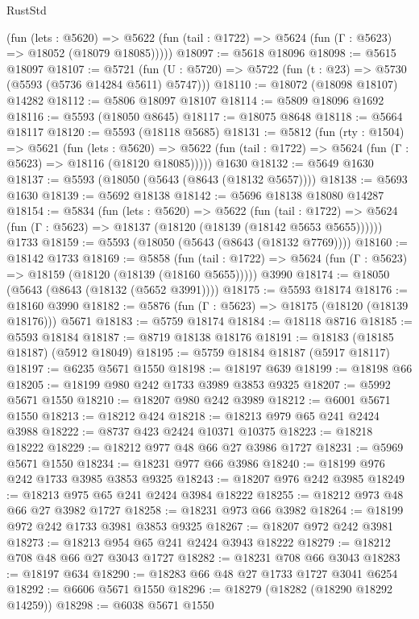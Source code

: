 \begin{lexlean}{RustStd}
\begin{coremodule}
      (fun (lets : @5620) =>
      @5622 (fun (tail : @1722) => @5624 (fun (Γ : @5623) => @18052 (@18079 @18085)))))
@18097 := @5618 @18096
@18098 := @5615 @18097
@18107 := @5721
    (fun (U : @5720) => @5722 (fun (t : @23) => @5730 (@5593 (@5736 @14284 @5611) @5747)))
@18110 := @18072 (@18098 @18107) @14282
@18112 := @5806 @18097 @18107
@18114 := @5809 @18096 @1692
@18116 := @5593 (@18050 @8645)
@18117 := @18075 @8648
@18118 := @5664 @18117
@18120 := @5593 (@18118 @5685)
@18131 := @5812
    (fun (rty : @1504) =>
    @5621
      (fun (lets : @5620) =>
      @5622 (fun (tail : @1722) => @5624 (fun (Γ : @5623) => @18116 (@18120 @18085)))))
    @1630
@18132 := @5649 @1630
@18137 := @5593 (@18050 (@5643 (@8643 (@18132 @5657))))
@18138 := @5693 @1630
@18139 := @5692 @18138
@18142 := @5696 @18138 @18080 @14287
@18154 := @5834
    (fun (lets : @5620) =>
    @5622
      (fun (tail : @1722) =>
      @5624 (fun (Γ : @5623) => @18137 (@18120 (@18139 (@18142 @5653 @5655))))))
    @1733
@18159 := @5593 (@18050 (@5643 (@8643 (@18132 @7769))))
@18160 := @18142 @1733
@18169 := @5858
    (fun (tail : @1722) => @5624 (fun (Γ : @5623) => @18159 (@18120 (@18139 (@18160 @5655)))))
    @3990
@18174 := @18050 (@5643 (@8643 (@18132 (@5652 @3991))))
@18175 := @5593 @18174
@18176 := @18160 @3990
@18182 := @5876 (fun (Γ : @5623) => @18175 (@18120 (@18139 @18176))) @5671
@18183 := @5759 @18174
@18184 := @18118 @8716
@18185 := @5593 @18184
@18187 := @8719 @18138 @18176
@18191 := @18183 (@18185 @18187) (@5912 @18049)
@18195 := @5759 @18184 @18187 (@5917 @18117)
@18197 := @6235 @5671 @1550
@18198 := @18197 @639
@18199 := @18198 @66
@18205 := @18199 @980 @242 @1733 @3989 @3853 @9325
@18207 := @5992 @5671 @1550
@18210 := @18207 @980 @242 @3989
@18212 := @6001 @5671 @1550
@18213 := @18212 @424
@18218 := @18213 @979 @65 @241 @2424 @3988
@18222 := @8737 @423 @2424 @10371 @10375
@18223 := @18218 @18222
@18229 := @18212 @977 @48 @66 @27 @3986 @1727
@18231 := @5969 @5671 @1550
@18234 := @18231 @977 @66 @3986
@18240 := @18199 @976 @242 @1733 @3985 @3853 @9325
@18243 := @18207 @976 @242 @3985
@18249 := @18213 @975 @65 @241 @2424 @3984 @18222
@18255 := @18212 @973 @48 @66 @27 @3982 @1727
@18258 := @18231 @973 @66 @3982
@18264 := @18199 @972 @242 @1733 @3981 @3853 @9325
@18267 := @18207 @972 @242 @3981
@18273 := @18213 @954 @65 @241 @2424 @3943 @18222
@18279 := @18212 @708 @48 @66 @27 @3043 @1727
@18282 := @18231 @708 @66 @3043
@18283 := @18197 @634
@18290 := @18283 @66 @48 @27 @1733 @1727 @3041 @6254
@18292 := @6606 @5671 @1550
@18296 := @18279 (@18282 (@18290 @18292 @14259))
@18298 := @6038 @5671 @1550

\end{coremodule}
\end{lexlean}
